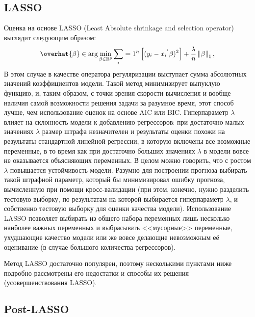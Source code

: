 \subsection{LASSO}
Оценка на основе LASSO (Least Absolute shrinkage and selection operator) выглядит следующим образом:
\begin{equation}
\overhat{\beta} \in \arg \min_{\beta \in
\mathbb{R}^p} \sum_i=1^n \left[ (y_i - {x_i}^{'} \beta)^2 \right] +  \frac{\lambda}{n} \left\lVert \beta \right\rVert_1,
\end{equation}
В этом случае в качестве оператора регуляризации выступает сумма абсолютных значений коэффициентов модели.
Такой метод минимизирует выпуклую функцию, и, таким образом, с точки зрения скорости вычисления и вообще наличия самой возможности решения задачи за разумное время, этот способ лучше, чем использование оценок на основе AIC или BIC. Гиперпараметр $\lambda$ влияет на склонность модели к добавлению регрессоров: при достаточно малых значениях $\lambda$ размер штрафа незначителен и результаты оценки похожи на результаты стандартной линейной регрессии, в которую включены все возможные переменные, в то время как при достаточно больших значениях $\lambda$ в модели вовсе не оказывается объясняющих переменных. В целом можно говорить, что с ростом $\lambda$ повышается устойчивость модели. Разумно для построении прогноза выбирать такой штрафной параметр, который бы минимизировал ошибку прогноза, вычисленную при помощи кросс-валидации (при этом, конечно, нужно разделить тестовую выборку, по результатам на которой выбирается гиперпараметр $\lambda$, и собственно тестовую выборку для оценки качества модели). Использование LASSO позволяет выбирать из общего набора переменных лишь несколько наиболее важных переменных и выбрасывать <<мусорные>> переменные, ухудшающие качество модели или же вовсе делающие невозможным её оценивание (в случае большого количества регрессоров).


Метод LASSO достаточно популярен, поэтому несколькими пунктами ниже подробно рассмотрены его недостатки и способы их решения (усовершенствования LASSO).

\subsection{Post-LASSO}

